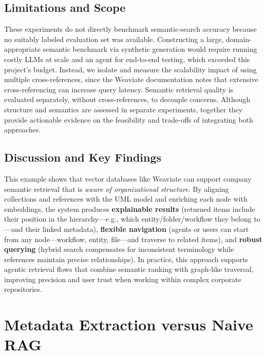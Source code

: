 \subsection{Limitations and Scope}
These experiments do not directly benchmark semantic-search accuracy because no suitably labeled evaluation set was available. Constructing a large, domain-appropriate semantic benchmark via synthetic generation would require running costly \glspl{LLM} at scale and an agent for end-to-end testing, which exceeded this project's budget. Instead, we isolate and measure the scalability impact of using multiple cross-references, since the Weaviate documentation \cite{weaviate} notes that extensive cross-referencing can increase query latency. Semantic retrieval quality is evaluated separately, without cross-references, to decouple concerns. Although structure and semantics are assessed in separate experiments, together they provide actionable evidence on the feasibility and trade-offs of integrating both approaches.
\subsection{Discussion and Key Findings}
This example shows that vector databases like Weaviate can support company semantic retrieval that is \textit{aware of organizational structure}. By aligning collections and references with the UML model and enriching each node with embeddings, the system produces \textbf{explainable results} (returned items include their position in the hierarchy—e.g., which entity/folder/workflow they belong to—and their linked metadata), \textbf{flexible navigation} (agents or users can start from any node—workflow, entity, file—and traverse to related items), and \textbf{robust querying} (hybrid search compensates for inconsistent terminology while references maintain precise relationships).
In practice, this approach supports agentic retrieval flows that combine semantic ranking with graph-like traversal, improving precision and user trust when working within complex corporate repositories.


\section{Metadata Extraction versus Naive RAG}

